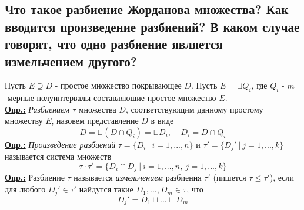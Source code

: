 
\subsection{Что такое разбиение Жорданова множества? Как вводится произведение разбиений? В каком случае говорят, что одно разбиение является измельчением другого?}

Пусть $E \supseteq D$ - простое множество покрывающее $D$. Пусть $E = \sqcup Q_i$, где $Q_i$ - $m$-мерные полуинтервалы составляющие простое множество $E$. \\
\textbf{\underline{Опр.:} } \textit{Разбиением $\tau$} множества $D$, соответствующим данному простому множеству $E$, назовем представление $D$ в виде 
\[D = \sqcup(D\cap Q_i) = \sqcup D_i, \ \ \ \ \ D_i = D\cap Q_i\]
\textbf{\underline{Опр.:} } \textit{Произведение разбиений} $\tau = \{D_i \ | \ i = 1, ..., n\}$ и $\tau' = \{D_j' \ | \ j = 1, ..., k\}$ называется система множеств
\[\tau\cdot\tau' = \{D_i\cap D_j\ | \ i = 1, ..., n, \ j = 1, ..., k\}\]
\textbf{\underline{Опр.:} } Разбиение $\tau$ называется \textit{измельчением} разбиения $\tau'$ (пишется $\tau \leq \tau'$), если для любого $D_j' \in \tau'$ найдутся такие $D_1, ..., D_m \in \tau$, что 
\[D_j' = D_1\sqcup ... \sqcup D_m\]

